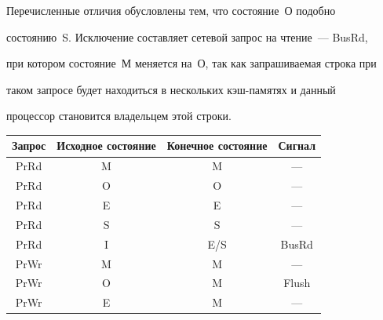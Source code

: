       Перечисленные отличия обусловлены тем, что состояние~О подобно 


состоянию~S. Исключение составляет сетевой запрос на чтение~--- BusRd, 


при котором состояние~М меняется на~О, так как запрашиваемая строка при 


таком запросе будет находиться в нескольких кэш-па\-мя\-тях и данный 


процессор  становится владельцем этой строки.





\begin{table}\small


\begin{center}


\parbox{292pt}{





}





\vspace*{2ex}





\begin{tabular}{|c|c|c|c|}


\hline


Запрос&Исходное состояние &Конечное состояние&Сигнал\\


\hline


PrRd&M&M&---\\


PrRd&O&O&---\\


PrRd&E&E&---\\


PrRd&S&S&---\\


PrRd


&I&E/S&BusRd\\


PrWr&M&M&---\\


PrWr&O&M&Flush\\


PrWr&E&M&---\\



\end{tabular}
\end{center}
\end{table}
